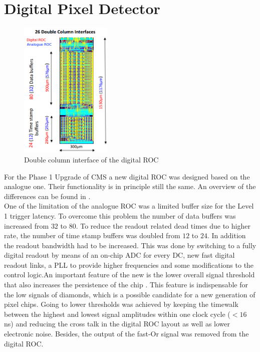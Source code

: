 \documentclass[british,11pt,a4paper]{memoir}
\begin{document}
\section{Digital Pixel Detector}\label{s23}
\begin{figure}
	\vspace*{-10pt}
	\includegraphics[width=4.4cm]{DigRocPeri}
	\caption{Double column interface of the digital \ac{ROC} \cite{hits}}
	\label{p12}
	\vspace*{-15pt}
\end{figure} 
For the Phase 1 Upgrade of \ac{CMS} a new digital \ac{ROC} was designed based on the analogue one. Their functionality is in principle still the same. An overview of the differences can be found in .\\
One of the limitation of the analogue \ac{ROC} was a limited buffer size for the Level 1 trigger latency. To overcome this problem the number of data buffers was increased from $32$ to $80$. To reduce the readout related dead times due to higher rate, the number of time stamp buffers was doubled from $12$ to $24$. In addition the readout bandwidth had to be increased. This was done by switching to a fully digital readout by means of an on-chip \ac{ADC} for every \ac{DC}, new fast digital readout links, a \ac{PLL} to provide higher frequencies and some modifications to the control logic.An important feature of the new is the lower overall signal threshold that also increases the persistence of the chip \cite{hits}. This feature is indispensable for the low signals of diamonds, which is a possible candidate for a new generation of pixel chips. Going to lower thresholds was achieved by keeping the timewalk between the highest and lowest signal amplitudes within one clock cycle ($<16\,$ns) and reducing the cross talk in the digital \ac{ROC} layout as well as lower electronic noise. Besides, the output of the fast-Or signal was removed from the digital \ac{ROC}.\\
\end{document}
